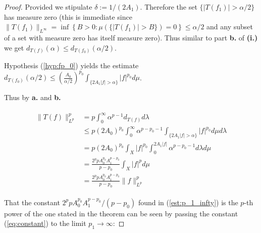 \begin{proof}
Provided we stipulate $\delta := 1/(2A_1)$. Therefore the set $\{\vert T(f_1) \vert > \alpha/2\}$ has measure zero (this is immediate since $\|T(f_1)\|_{L^\infty} =  \inf \left\{B > 0: \mu(\{\vert T(f_1) \vert > B\}) = 0 \right\} \leqslant \alpha/2 $ and any subset of a set with measure zero has itself measure zero). Thus similar to part \textbf{b.} of \textbf{(i.)} we get $d_{T(f)}(\alpha) \leqslant d_{T(f_0)}(\alpha/2)$.

	Hypothesis (\ref{hyp:fp_0}) yields the estimate $\displaystyle d_{T(f_0)}(\alpha/2) \leqslant \left(\frac{A_0}{\alpha/2}\right)^{p_0} \int_{\{2A_1\vert f \vert > \alpha\}} \vert f \vert^{p_0}d\mu$.

	Thus by \textbf{a.} and \textbf{b.}

	\begin{gather}
		\begin{aligned}
			\|T(f)\|_{L^p}^p &= p \int_0^{\infty} \alpha^{p-1}d_{T(f)} d\lambda\\
			&\leqslant p (2A_0)^{p_0} \int_0^{\infty} \alpha^{p-p_0-1} \int_{\{2A_1\vert f \vert > \alpha\}} \vert f \vert^{p_0}d\mu d\lambda\\
			&= p(2A_0)^{p_0} \int_X \vert f\vert^{p_0} \int_0^{2A_1\vert f \vert} \alpha^{p - p_0 - 1}d\lambda d\mu\\
			&= \frac{2^ppA_0^{p_0}A_1^{p - p_0}}{p - p_0} \int_X \vert f\vert^{p} d\mu\\
			&= \frac{2^ppA_0^{p_0}A_1^{p - p_0}}{p - p_0} \|f\|_{L^p}^p
			\label{est:p_1_infty}
		\end{aligned}
	\end{gather}

	That the constant $2^ppA_0^{p_0}A_1^{p - p_0}/(p - p_0)$ found in (\ref{est:p_1_infty}) is the $p$-th power of the one stated in the theorem can be seen by passing the constant (\ref{eq:constant}) to the limit $p_1 \rightarrow \infty$:


\end{proof}
